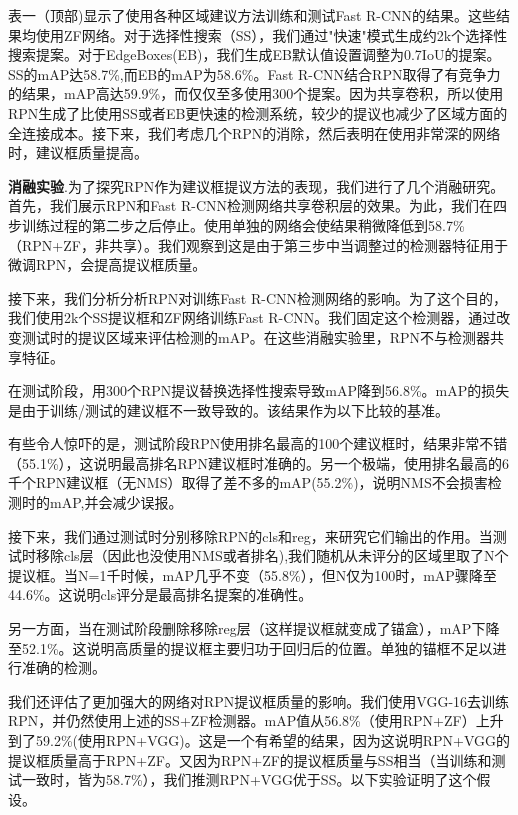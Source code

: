 \documentclass[12pt,a4paper,titlepage]{article}
\begin{document}
表一（顶部)显示了使用各种区域建议方法训练和测试Fast R-CNN的结果。这些结果均使用ZF网络。对于选择性搜索（SS），我们通过"快速"模式生成约2k个选择性搜索提案。对于EdgeBoxes(EB)，我们生成EB默认值设置调整为0.7IoU的提案。SS的mAP达58.7\%,而EB的mAP为58.6\%。Fast R-CNN结合RPN取得了有竞争力的结果，mAP高达59.9\%，而仅仅至多使用300个提案。因为共享卷积，所以使用RPN生成了比使用SS或者EB更快速的检测系统，较少的提议也减少了区域方面的全连接成本。接下来，我们考虑几个RPN的消除，然后表明在使用非常深的网络时，建议框质量提高。\par
\textbf{消融实验}.为了探究RPN作为建议框提议方法的表现，我们进行了几个消融研究。首先，我们展示RPN和Fast R-CNN检测网络共享卷积层的效果。为此，我们在四步训练过程的第二步之后停止。使用单独的网络会使结果稍微降低到58.7\%（RPN+ZF，非共享）。我们观察到这是由于第三步中当调整过的检测器特征用于微调RPN，会提高提议框质量。\par

接下来，我们分析分析RPN对训练Fast R-CNN检测网络的影响。为了这个目的，我们使用2k个SS提议框和ZF网络训练Fast R-CNN。我们固定这个检测器，通过改变测试时的提议区域来评估检测的mAP。在这些消融实验里，RPN不与检测器共享特征。\par

在测试阶段，用300个RPN提议替换选择性搜索导致mAP降到56.8\%。mAP的损失是由于训练/测试的建议框不一致导致的。该结果作为以下比较的基准。\par

有些令人惊吓的是，测试阶段RPN使用排名最高的100个建议框时，结果非常不错（55.1\%），这说明最高排名RPN建议框时准确的。另一个极端，使用排名最高的6千个RPN建议框（无NMS）取得了差不多的mAP(55.2\%)，说明NMS不会损害检测时的mAP,并会减少误报。\par

接下来，我们通过测试时分别移除RPN的cls和reg，来研究它们输出的作用。当测试时移除cls层（因此也没使用NMS或者排名),我们随机从未评分的区域里取了N个提议框。当N=1千时候，mAP几乎不变（55.8\%），但N仅为100时，mAP骤降至44.6\%。这说明cls评分是最高排名提案的准确性。\par

另一方面，当在测试阶段删除移除reg层（这样提议框就变成了锚盒），mAP下降至52.1\%。这说明高质量的提议框主要归功于回归后的位置。单独的锚框不足以进行准确的检测。\par

我们还评估了更加强大的网络对RPN提议框质量的影响。我们使用VGG-16去训练RPN，并仍然使用上述的SS+ZF检测器。mAP值从56.8\%（使用RPN+ZF）上升到了59.2\%(使用RPN+VGG)。这是一个有希望的结果，因为这说明RPN+VGG的提议框质量高于RPN+ZF。又因为RPN+ZF的提议框质量与SS相当（当训练和测试一致时，皆为58.7\%），我们推测RPN+VGG优于SS。以下实验证明了这个假设。
\end{document}
